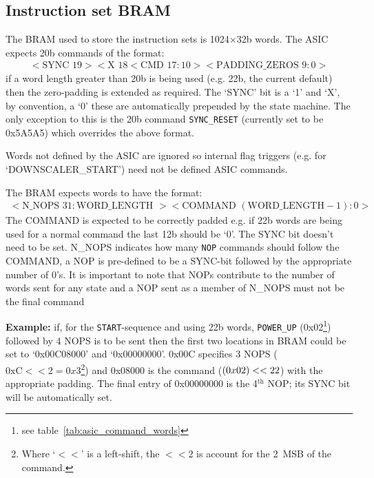\documentclass[]{report}
\begin{document}
    \subsection{Instruction set BRAM} %
    \label{sub:tx_bram}
    The BRAM used to store the instruction sets is 1024\(\times\)32b words. The ASIC expects 20b commands of the format:
    \begin{align}\label{fmt:asic_format}
        <\text{SYNC }19><\text{X }18<\text{CMD } 17:10><\text{PADDING\_ZEROS } 9:0>
    \end{align}
    if a word length greater than 20b is being used (e.g. 22b, the current default) then the zero-padding is extended as required. The `SYNC' bit is a `1' and `X', by convention, a `0' these are automatically prepended by the state machine. The only exception to this is the 20b command \texttt{SYNC\_RESET} (currently set to be 0x5A5A5) which overrides the above format.

    Words not defined by the ASIC are ignored so internal flag triggers (e.g. for `DOWNSCALER\_START') need not be defined ASIC commands.

    The BRAM expects words to have the format:
    \begin{align}\label{fmt:tx_bram}
        <\text{N\_NOPS } 31:\text{WORD\_LENGTH }><\text{COMMAND } (\text{WORD\_LENGTH} - 1):0>
    \end{align}
    The COMMAND is expected to be correctly padded e.g. if 22b words are being used for a normal command the last 12b should be `0'. The SYNC bit doesn't need to be set. N\_NOPS indicates how many \texttt{NOP} commands should follow the COMMAND, a NOP is pre-defined to be a SYNC-bit followed by the appropriate number of 0's. It is important to note that NOPs contribute to the number of words sent for any state and a NOP sent as a member of N\_NOPS must not be the final command

    \textbf{Example:} if, for the \texttt{START}-sequence and using 22b words, \texttt{POWER\_UP} (0x02\footnote{see table~\ref{tab:asic_command_words}}) followed by 4 NOPS is to be sent then the first two locations in BRAM could be set to `0x00C08000' and `0x00000000'. 0x00C specifies 3 NOPS (\(\text{0xC}<<2 = 0x3\)\footnote{Where `\(<<\)' is a left-shift, the \( <<2 \) is account for the 2~MSB of the command.}) and 0x08000 is the command (\(\text(0x02) << 22 \)) with the appropriate padding. The final entry of 0x00000000 is the 4\(^{\text{th}}\) NOP; its SYNC bit will be automatically set.
\end{document}
